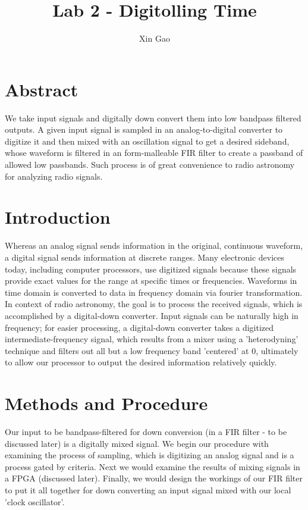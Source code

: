 \documentclass[12pt]{article}
\begin{document}
\title{Lab 2 - Digitolling Time}
\author{Xin Gao}
\date{}
\maketitle

\section{Abstract}
We take input signals and digitally down convert them into low bandpass
filtered outputs. A given input signal is sampled in an
analog-to-digital converter to digitize it and then mixed with an
oscillation signal to get a desired sideband, whose waveform is filtered
in an form-malleable FIR filter to create a passband of allowed low
passbands. Such process is of great convenience to radio astronomy for
analyzing radio signals. 
\section{Introduction}
Whereas an analog signal sends information in the original, continuous
waveform, a digital signal sends information at discrete ranges. Many
electronic devices today, including computer processors, use digitized
signals because these signals provide exact values for the range at
specific times or frequencies. Waveforms in time domain is converted to
data in frequency domain via fourier transformation. In context of radio
astronomy, the goal is to process the received signals, which is
accomplished by a digital-down converter. Input signals can be naturally
high in frequency; for easier processing, a digital-down converter takes
a digitized intermediate-frequency signal, which results from a mixer
using a 'heterodyning' technique and filters out all but a low frequency
band 'centered' at 0, ultimately to allow our processor to
output the desired information relatively quickly.
\section{Methods and Procedure}
Our input to be bandpass-filtered for down conversion (in a FIR filter -
to be discussed later) is a digitally mixed signal. We begin our
procedure with examining the process of sampling, which is digitizing an
analog signal and is a process gated by criteria. Next we would examine
the results of mixing signals in a FPGA (discussed later). Finally, we
would design the workings of our FIR filter to put it all together for
down converting an input signal mixed with our local 'clock oscillator'. 
\end{document}
